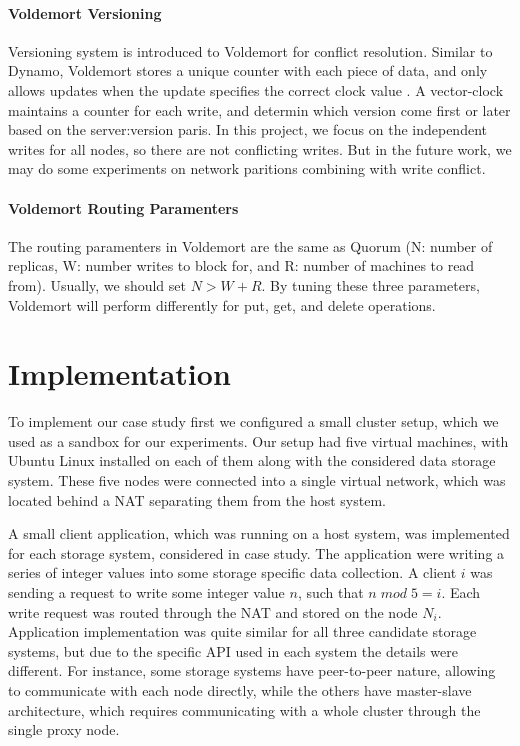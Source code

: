 \documentclass[a4paper]{article}
\begin{document}
\paragraph{Voldemort Versioning}

Versioning system is introduced to Voldemort for conflict resolution. Similar to Dynamo, Voldemort stores a unique counter with each piece of data, and only allows updates when the update specifies the correct clock value \cite{decandia2007dynamo}. A vector-clock maintains a counter for each write, and determin which version come first or later based on the server:version paris. In this project, we focus on the independent writes for all nodes, so there are not conflicting writes. But in the future work, we may do some experiments on network paritions combining with write conflict.

\paragraph{Voldemort Routing Paramenters}

The routing paramenters in Voldemort are the same as Quorum (N: number of replicas, W: number writes to block for, and R: number of machines to read from). Usually, we should set $N > W + R$. By tuning these three parameters, Voldemort will perform differently for put, get, and delete operations. 

\section{Implementation}

To implement our case study first we configured a small cluster setup, which we used as a sandbox for our experiments.
Our setup had five virtual machines, with Ubuntu Linux installed on each of them along with the considered data storage system. 
These five nodes were connected into a single virtual network, which was located behind a NAT separating them from the host system.

A small client application, which was running on a host system, was implemented for each storage system, considered in case study.
The application were writing a series of integer values into some storage specific data collection.
A client $i$ was sending a request to write some integer value $n$, such that $n\;mod\;5 = i$.
Each write request was  routed through the NAT and stored on the node $N_i$. 
Application implementation was quite similar for all three candidate storage systems, but due to the specific API used in each system the details were different.
For instance, some storage systems have peer-to-peer nature, allowing to communicate with each node directly, while the others have master-slave architecture, which requires communicating with a whole cluster through the single proxy node. 
\end{document}
